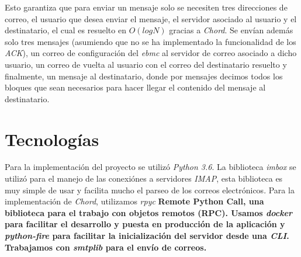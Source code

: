 \documentclass[a4paper]{article}
\begin{document}
	Esto garantiza que para enviar un mensaje solo se necesiten tres direcciones de correo, el usuario que desea enviar el mensaje, el servidor asociado al usuario y el destinatario, el cual es resuelto en $O(logN)$ gracias a \emph{Chord}. Se envían además solo tres mensajes (asumiendo que no se ha implementado la funcionalidad de los \emph{ACK}), un correo de configuración del \emph{ebmc} al servidor de correo asociado a dicho usuario, un correo de vuelta al usuario con el correo del destinatario resuelto y finalmente, un mensaje al destinatario, donde por mensajes decimos todos los bloques que sean necesarios para hacer llegar el contenido del mensaje al destinatario.
	

\section{Tecnologías}
Para la implementación del proyecto se utilizó \emph{Python 3.6}. La biblioteca \emph{imbox} se utilizó para el manejo de las conexiónes a servidores \emph{IMAP}, esta biblioteca es muy simple de usar y facilita mucho el parseo de los correos electrónicos. Para la implementación de \emph{Chord}, utilizamos \emph{rpyc} \bfseries{Remote Python Call}, una biblioteca para el trabajo con objetos remotos (RPC). Usamos \emph{docker} para facilitar el desarrollo y puesta en producción de la aplicación y \emph{python-fire} para facilitar la inicialización del servidor desde una \emph{CLI}. Trabajamos con \emph{smtplib} para el envío de correos.
\end{document}
